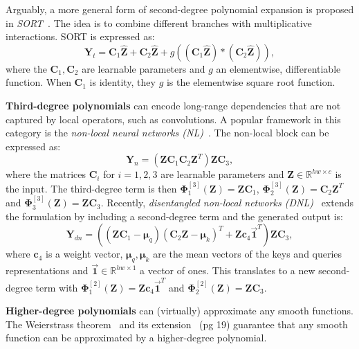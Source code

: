 \documentclass[runningheads]{llncs}
\newcommand{\realnum}{\mathbb{R}}
\providecommand{\minvar}{\bm{Z}}
\providecommand{\mvinvar}{\hat{\minvar}}
\providecommand{\matr}{\bm{\Phi}}
\providecommand{\matra}[2]{\matr_{#1}^{[#2]}}
\begin{document}
Arguably, a more general form of second-degree polynomial expansion is proposed in \emph{SORT}~\cite{wang2017sort}. The idea is to combine different branches with multiplicative interactions. SORT is expressed as: 
\begin{equation}
    {\bm{Y}}_{t} = \bm{C}_1\mvinvar + \bm{C}_2\mvinvar +  g((\bm{C}_1\mvinvar) * (\bm{C}_2\mvinvar)),
    \label{eq:nosharing_sort_block}
\end{equation}
where the $\bm{C}_1, \bm{C}_2$ are learnable parameters and $g$ an elementwise, differentiable function. When $\bm{C}_1$ is identity, they $g$ is the elementwise square root function. 







\noindent\textbf{Third-degree polynomials} can encode long-range dependencies that are not captured by local operators, such as convolutions. 
A popular framework in this category is the \emph{non-local neural networks (NL)}~\cite{wang2018non}. The non-local block can be expressed as: 
\begin{equation}
    {\bm{Y}}_{n} = (\minvar \bm{C}_1 \bm{C}_2 \minvar^T)\minvar\bm{C}_3,
    \label{eq:nosharing_nl_block}
\end{equation}
where the matrices $\bm{C}_i$ for $i=1,2,3$ are learnable parameters and $\minvar \in \realnum^{hw \times c}$ is the input. The third-degree term is then $\matra{1}{3}(\minvar) = \minvar \bm{C}_1$,  $\matra{2}{3}(\minvar) = \bm{C}_2 \minvar^T$ and $\matra{3}{3}(\minvar) = \minvar\bm{C}_3$. 
Recently, \emph{disentangled non-local networks (DNL)}~\cite{yin2020disentangled} extends the formulation by including a second-degree term and the generated output is:
\begin{equation}
    {\bm{Y}}_{dn} = ((\minvar \bm{C}_1 - \bm{\mu}_q) (\bm{C}_2 \minvar - \bm{\mu}_k)^T + \minvar \bm{c}_4 \overrightarrow{\bm{1}}^T)\minvar\bm{C}_3,
    \label{eq:nosharing_dnl_block}
\end{equation}
where $\bm{c}_4$ is a weight vector, $\bm{\mu}_q, \bm{\mu}_k$ are the mean vectors of the keys and queries representations and $\overrightarrow{\bm{1}} \in \realnum^{hw\times 1}$ a vector of ones. This translates to a new second-degree term with $\matra{1}{2}(\minvar) = \minvar \bm{c}_4 \overrightarrow{\bm{1}}^T$ and $\matra{2}{2}(\minvar) = \minvar\bm{C}_3$.




\noindent\textbf{Higher-degree polynomials} can (virtually) approximate any smooth functions. The Weierstrass theorem~\cite{stone1948generalized} and its extension~\cite{nikol2013analysis} (pg 19) guarantee that any smooth function can be approximated by a higher-degree polynomial.
\end{document}
